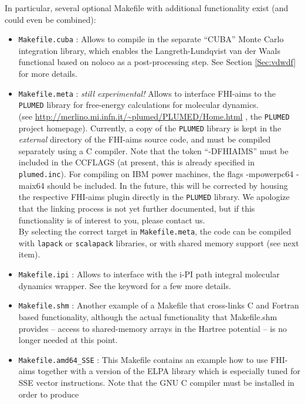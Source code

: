 In particular, several optional Makefile with additional functionality
exist (and could even be combined):
\begin{itemize}
  \item \texttt{Makefile.cuba} : Allows to compile in the separate ``CUBA''
    Monte Carlo integration library, which enables the Langreth-Lundqvist van
    der Waals functional based on noloco as a post-processing step. See Section
    \ref{Sec:vdwdf} for more details.
  \item \texttt{Makefile.meta} : \emph{still experimental!} Allows to
    interface FHI-aims to the \texttt{PLUMED} library for free-energy
    calculations for molecular dynamics. \\ (see
    \url{http://merlino.mi.infn.it/\~plumed/PLUMED/Home.html} , the \texttt{PLUMED}
    project homepage). Currently, a copy of the \texttt{PLUMED} library is
    kept in the \emph{external} directory of the FHI-aims source code, and
    must be compiled separately using a C compiler. Note that
     the token ``-DFHIAIMS'' must be included in the CCFLAGS (at present, this is already specified in \texttt{plumed.inc}). 
     For compiling on IBM power machines, the flags -mpowerpc64 -maix64 should
    be included. In the future, this will be corrected by housing the
    respective FHI-aims plugin directly in the \texttt{PLUMED} library. We
    apologize that the linking process is not yet further documented,
    but if this functionality is of interest to you, please contact us.\\
    By selecting the correct target in \texttt{Makefile.meta}, the code can be compiled 
    with \texttt{lapack} or \texttt{scalapack} libraries, or with shared memory support (see next item).
  \item \texttt{Makefile.ipi} : Allows to interface with the i-PI path integral molecular dynamics wrapper\cite{CeriottiMoreMano_2013}.
    See the  keyword for a few more details.
  \item \texttt{Makefile.shm} : Another example of a Makefile that
    cross-links C and Fortran based functionality, although the
    actual functionality that Makefile.shm provides --  access to
    shared-memory arrays in the Hartree potential -- is no longer
    needed at this point.
  \item \texttt{Makefile.amd64\_SSE} : This Makefile contains an
    example how to use FHI-aims together with a version of the 
    ELPA library which is especially tuned for SSE vector instructions.
    Note that the GNU C compiler must be installed in order to produce

\end{itemize}
